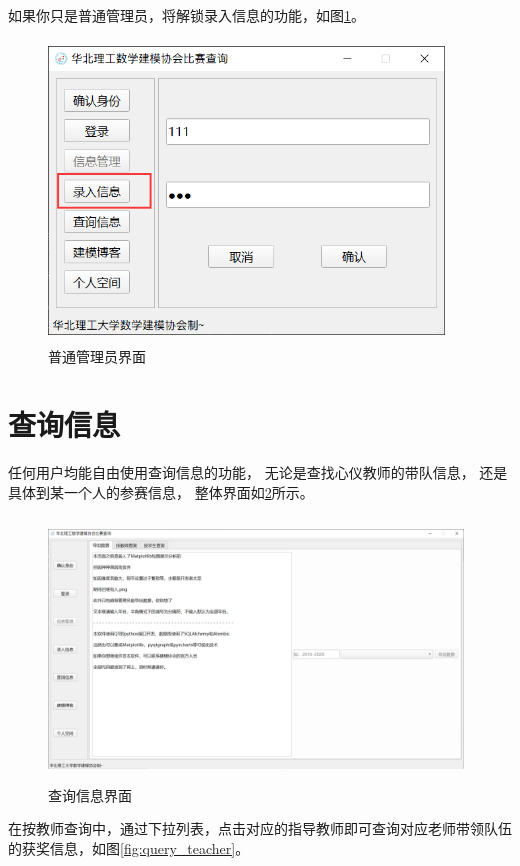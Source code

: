 \documentclass[cn, 11pt, chinese, show]{elegantbook}
\begin{document}
\newpage

如果你只是普通管理员，将解锁录入信息的功能，如图\ref{fig:admin}。

\begin{figure}[h]
    \centering
    \includegraphics[width=10.5cm, height=8cm]{figure/5.png}
    \caption{普通管理员界面}
    \label{fig:admin}
\end{figure}

\section{查询信息}

任何用户均能自由使用查询信息的功能， 无论是查找心仪教师的带队信息， 还是具体到某一个人的参赛信息， 
整体界面如\ref{fig:query}所示。

\begin{figure}[h]
    \centering
    \includegraphics[width=11cm, height=7cm]{figure/6.png}
    \caption{查询信息界面}
    \label{fig:query}
\end{figure}

在按教师查询中，通过下拉列表，点击对应的指导教师即可查询对应老师带领队伍的获奖信息，如图\ref{fig:query_teacher}。
\end{document}
